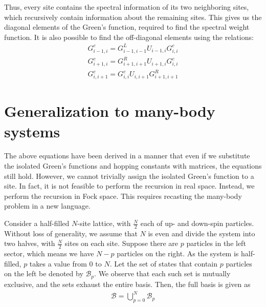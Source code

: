 	Thus, every site contains the spectral information of its two neighboring sites, which recursively contain information about the remaining sites. This gives us the diagonal elements of the Green's function, required to find the spectral weight function. It is also possible to find the off-diagonal elements using the relations:
	\begin{align}\label{eqn:connecting-eqn-onebody}
		G^{c}_{i-1,i} = G^{L}_{i-1,i-1} U_{i-1,i} G^{c}_{i,i}\\
		G^{c}_{i+1,i} = G^{R}_{i+1,i+1} U_{i+1,i} G^{c}_{i,i}\\
		G^{c}_{i,i+1} = G^{c}_{i,i} U_{i,i+1} G^{R}_{i+1,i+1}
	\end{align}

\section{Generalization to many-body systems}\label{sec:generalized-manybody}
	The above equations have been derived in a manner that even if we substitute the isolated Green's functions and hopping constants with matrices, the equations still hold.
	However, we cannot trivially assign the isolated Green's function to a site. In fact, it is not feasible to perform the recursion in real space. Instead, we perform the recursion in Fock space. This requires recasting the many-body problem in a new language.
	
	Consider a half-filled $ N $-site lattice, with $ \tfrac{N}{2} $ each of up- and down-spin particles. Without loss of generality, we assume that $ N $ is even and divide the system into two halves, with $ \tfrac{N}{2} $ sites on each site. Suppose there are $ p $ particles in the left sector, which means we have $ N-p $ particles on the right. As the system is half-filled, $ p $ takes a value from $ 0 $ to $ N $. Let the set of states that contain $ p $ particles on the left be denoted by $ \mathcal{B}_{p} $. We observe that each such set is mutually exclusive, and the sets exhaust the entire basis. Then, the full basis is given as
	\begin{align}
		\mathcal{B} = \bigcup_{p = 0}^{N} \mathcal{B}_p
	\end{align}
	

